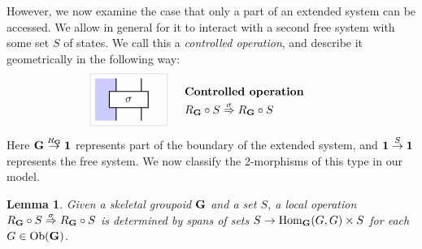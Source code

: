 \documentclass[a4paper,12pt]{article}
\makeatletter
\newtheorem{lemma}[theorem]{Lemma}
\theoremstyle{definition}
\newcommand\cat[1]{{\ensuremath{\bf #1}}}
\renewcommand{\-}[0]{\nobreakdash-\hspace{0pt}}
\newcommand\Ob{\ensuremath{\mathrm{Ob}}}
\newcommand\Hom{\ensuremath{\mathrm{Hom}}}
\newcommand\GB{\ensuremath{R_{\cat G}}}
\newcommand\xto[1]{\ensuremath{\smash{{}\stackrel{\smash{#1}}{\to}{}}}}
\newcommand\xtoo[1]{\ensuremath{\smash{{}\stackrel{\smash{#1}}{\Rightarrow}{}}}}
\def\syntaxfill{blue!20}
\def\innerboxsep{3pt}
\def\innersep{4pt}
\newcommand\vc[1]{\begin{tabular}{@{}l}#1\end{tabular}}
\newcommand{\centerdia}[1]{\ensuremath{#1}}
\newcommand\newtwocell[3]{\centerdia{\begin{aligned}
\begin{tikzpicture}[scale=1.3]
    #1
    \draw [black!20]
        ([xshift=-\innerboxsep, yshift=-\innerboxsep] current bounding box.south west)
        rectangle
        ([xshift=\innerboxsep, yshift=\innerboxsep] current bounding box.north east);
\end{tikzpicture}
\end{aligned}}
& \hspace{15pt} \makebox[120pt][l]{\bf\vc{#2 \\[\innersep] #3}}}
\makeatother
\begin{document}
However, we now examine the case that only a part of an extended system can be accessed. We allow in general for it to interact with a second free system with some set $S$ of states. We call this a \textit{controlled operation}, and describe it geometrically in the following way:
\def\innerboxsep{3pt}
\begin{align*}
\newtwocell{
    \draw [thick, white] (0.2,0.5) to (1.8,0.5);
    \draw [fill=\syntaxfill, draw=none] (0.2,0.5)
        to (0.2,1.5) to (0.7,1.5) to (0.7,0.5) to (0.7,0.5);
    \draw [thick] (0.7,0.5) to (0.7,1.5);
    \draw [thick] (1.3,0.5) to (1.3,1.5);
    \node [draw, thick, minimum width=1.2cm, fill=white, minimum height=0.5cm] at (1,1) {$\sigma$};
}
{Controlled operation}
{$\GB \circ S \xtoo \sigma \GB \circ S$}
\end{align*}
Here $\cat G \xto \GB \cat 1$ represents part of the boundary of the extended system, and $\cat 1 \xto S \cat 1$ represents the free system. We now classify the 2\-morphisms of this type in our model.
\begin{lemma}
\label{lem:controlled}
Given a skeletal groupoid \cat G and a set $S$, a local operation $\GB \circ S \xtoo \sigma \GB \circ S$ is determined by spans of sets $S \to \Hom_\cat G (G,G) \times S$ for each $G \in \Ob(\cat G)$.
\end{lemma} 
\end{document}
